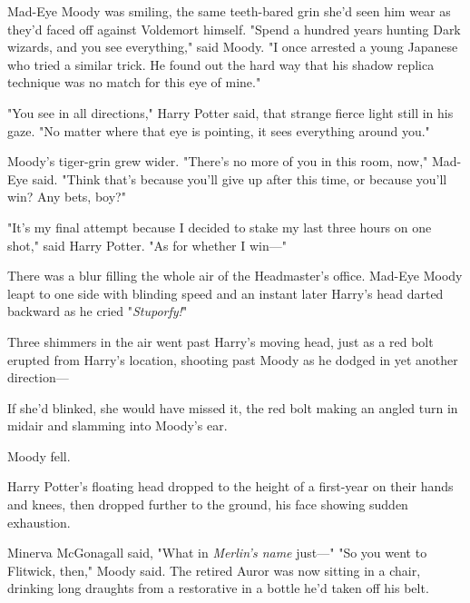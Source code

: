 Mad-Eye Moody was smiling, the same teeth-bared grin she'd seen him wear as
they'd faced off against Voldemort himself. "Spend a hundred years hunting Dark
wizards, and you see everything," said Moody. "I once arrested a young Japanese
who tried a similar trick. He found out the hard way that his shadow replica
technique was no match for this eye of mine."

"You see in all directions," Harry Potter said, that strange fierce light still
in his gaze. "No matter where that eye is pointing, it sees everything around
you."

Moody's tiger-grin grew wider. "There's no more of you in this room, now,"
Mad-Eye said. "Think that's because you'll give up after this time, or because
you'll win? Any bets, boy?"

"It's my final attempt because I decided to stake my last three hours on one
shot," said Harry Potter. "As for whether I win—"

There was a blur filling the whole air of the Headmaster's office. Mad-Eye
Moody leapt to one side with blinding speed and an instant later Harry's head
darted backward as he cried "\emph{Stuporfy!}"

Three shimmers in the air went past Harry's moving head, just as a red bolt
erupted from Harry's location, shooting past Moody as he dodged in yet another
direction—

If she'd blinked, she would have missed it, the red bolt making an angled turn
in midair and slamming into Moody's ear.

Moody fell.

Harry Potter's floating head dropped to the height of a first-year on their
hands and knees, then dropped further to the ground, his face showing sudden
exhaustion.

Minerva McGonagall said, "What in \emph{Merlin's name} just—"
\sbreak
"So you went to Flitwick, then," Moody said. The retired Auror was now sitting
in a chair, drinking long draughts from a restorative in a bottle he'd taken
off his belt.

